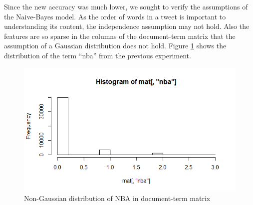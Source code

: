 \documentclass[journal, a4paper]{IEEEtran}
\begin{document}
Since the new accuracy was much lower, we sought to verify the assumptions of the Naive-Bayes model. As the order of words in a tweet is important to understanding its content, the independence assumption may not hold. Also the features are so sparse in the columns of the document-term matrix that the assumption of a Gaussian distribution does not hold. Figure \ref{fig:1} shows the distribution of the term “nba” from the previous experiment.
\begin{figure}[!hbt]
	\centering
	\includegraphics[width=\columnwidth]{image00.png}
	\caption{Non-Gaussian distribution of NBA in document-term matrix}
	\label{fig:1}
\end{figure}
\end{document}
